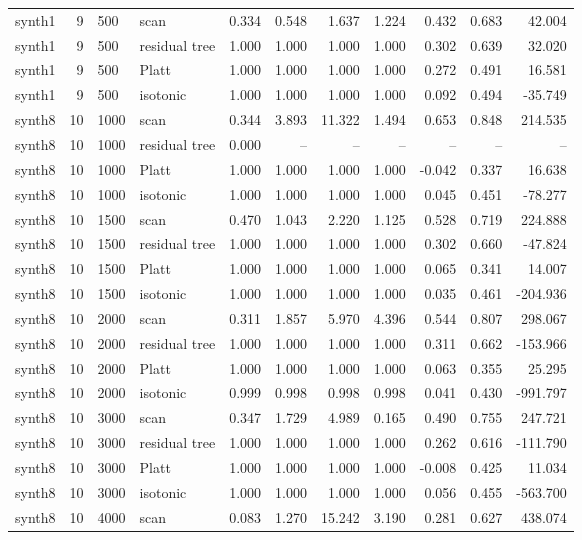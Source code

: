 \begin{tabular}{lrllrrrrrrr}
synth1 & 9 & 500 & scan & 0.334 & 0.548 & 1.637 & 1.224 & 0.432 & 0.683 & 42.004 \\
synth1 & 9 & 500 & residual tree & 1.000 & 1.000 & 1.000 & 1.000 & 0.302 & 0.639 & 32.020 \\
synth1 & 9 & 500 & Platt & 1.000 & 1.000 & 1.000 & 1.000 & 0.272 & 0.491 & 16.581 \\
synth1 & 9 & 500 & isotonic & 1.000 & 1.000 & 1.000 & 1.000 & 0.092 & 0.494 & -35.749 \\
synth8 & 10 & 1000 & scan & 0.344 & 3.893 & 11.322 & 1.494 & 0.653 & 0.848 & 214.535 \\
synth8 & 10 & 1000 & residual tree & 0.000 & -- & -- & -- & -- & -- & -- \\
synth8 & 10 & 1000 & Platt & 1.000 & 1.000 & 1.000 & 1.000 & -0.042 & 0.337 & 16.638 \\
synth8 & 10 & 1000 & isotonic & 1.000 & 1.000 & 1.000 & 1.000 & 0.045 & 0.451 & -78.277 \\
synth8 & 10 & 1500 & scan & 0.470 & 1.043 & 2.220 & 1.125 & 0.528 & 0.719 & 224.888 \\
synth8 & 10 & 1500 & residual tree & 1.000 & 1.000 & 1.000 & 1.000 & 0.302 & 0.660 & -47.824 \\
synth8 & 10 & 1500 & Platt & 1.000 & 1.000 & 1.000 & 1.000 & 0.065 & 0.341 & 14.007 \\
synth8 & 10 & 1500 & isotonic & 1.000 & 1.000 & 1.000 & 1.000 & 0.035 & 0.461 & -204.936 \\
synth8 & 10 & 2000 & scan & 0.311 & 1.857 & 5.970 & 4.396 & 0.544 & 0.807 & 298.067 \\
synth8 & 10 & 2000 & residual tree & 1.000 & 1.000 & 1.000 & 1.000 & 0.311 & 0.662 & -153.966 \\
synth8 & 10 & 2000 & Platt & 1.000 & 1.000 & 1.000 & 1.000 & 0.063 & 0.355 & 25.295 \\
synth8 & 10 & 2000 & isotonic & 0.999 & 0.998 & 0.998 & 0.998 & 0.041 & 0.430 & -991.797 \\
synth8 & 10 & 3000 & scan & 0.347 & 1.729 & 4.989 & 0.165 & 0.490 & 0.755 & 247.721 \\
synth8 & 10 & 3000 & residual tree & 1.000 & 1.000 & 1.000 & 1.000 & 0.262 & 0.616 & -111.790 \\
synth8 & 10 & 3000 & Platt & 1.000 & 1.000 & 1.000 & 1.000 & -0.008 & 0.425 & 11.034 \\
synth8 & 10 & 3000 & isotonic & 1.000 & 1.000 & 1.000 & 1.000 & 0.056 & 0.455 & -563.700 \\
synth8 & 10 & 4000 & scan & 0.083 & 1.270 & 15.242 & 3.190 & 0.281 & 0.627 & 438.074 \\

\end{tabular}
